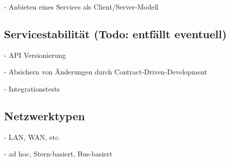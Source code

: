     - Anbieten eines Services als Client/Server-Modell
    
    \subsection{Servicestabilität (Todo: entfällt eventuell)}
    - API Versionierung
    
    - Absichern von Änderungen durch Contract-Driven-Development
    
    - Integrationstests
    \subsection{Netzwerktypen}
		- LAN, WAN, etc.
		
		- ad hoc, Stern-basiert, Bus-basiert
